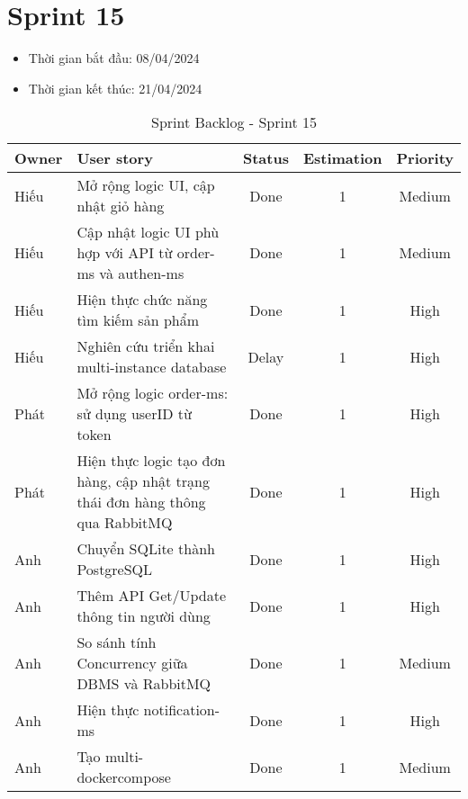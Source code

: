 \section{Sprint 15}
\begin{itemize}
    \item Thời gian bắt đầu: 08/04/2024
    \item Thời gian kết thúc: 21/04/2024
\end{itemize}
\begin{table}[H]
    \begin{tabular}{|m{2.5cm}|m{6cm}|c|c|c|}
    \hline
    \textbf{Owner}  & \textbf{User story}                                & \textbf{Status} & \textbf{Estimation} & \textbf{Priority} \\ \hline
    Hiếu                & Mở rộng logic UI, cập nhật giỏ hàng                   & Done            & 1                   & Medium         \\ \hline
    Hiếu               & Cập nhật logic UI phù hợp với API từ order-ms và authen-ms                   & Done            & 1                   & Medium         \\ \hline
    Hiếu                & Hiện thực chức năng tìm kiếm sản phẩm                 & Done            & 1                   & High         \\ \hline
    Hiếu               & Nghiên cứu triển khai multi-instance database                     & Delay           & 1                   & High         \\ \hline
    Phát               & Mở rộng logic order-ms: sử dụng userID từ token                     & Done            & 1                   & High         \\ \hline
    Phát               & Hiện thực logic tạo đơn hàng, cập nhật trạng thái đơn hàng thông qua RabbitMQ                     & Done            & 1                   & High         \\ \hline
    Anh               & Chuyển SQLite thành PostgreSQL                   & Done            & 1                   & High         \\ \hline
    Anh               & Thêm API Get/Update thông tin người dùng                   & Done            & 1                   & High         \\ \hline
    Anh               & So sánh tính Concurrency giữa DBMS và RabbitMQ                     & Done            & 1                   & Medium        \\ \hline
    Anh               & Hiện thực notification-ms                  & Done            & 1                   & High         \\ \hline
    Anh              & Tạo multi-dockercompose                     & Done            & 1                   & Medium        \\ \hline
    \end{tabular}
    \caption{Sprint Backlog - Sprint 15}
    \label{tab:sprint-15}
\end{table}
